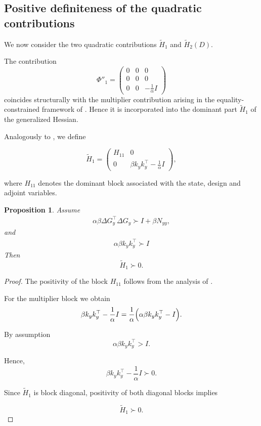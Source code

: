 \documentclass[11pt]{article}
\newtheorem{proposition}{Proposition}
\begin{document}
\subsection{Positive definiteness of the quadratic contributions}

We now consider the two quadratic contributions $\tilde{H}_1$ and $\tilde{H}_2(D)$.

The contribution
\[
\Phi''_1
=
\begin{pmatrix}
0&0&0\\
0&0&0\\
0&0&-\frac1\alpha I
\end{pmatrix}
\]
coincides structurally with the multiplier contribution arising in the
equality-constrained framework of \cite{walther2018equality}. Hence it
is incorporated into the dominant part $\tilde H_1$ of the generalized
Hessian.

Analogously to \cite{walther2018equality}, we define

\[
\tilde H_1=
\begin{pmatrix}
H_{11} & 0
\\
0 &
\beta k_y k_y^\top-\frac1\alpha I
\end{pmatrix},
\]

where $H_{11}$ denotes the dominant block associated with the state, design and adjoint variables.

\begin{proposition}
\label{prop:H1}
Assume
\begin{align}
    \alpha\beta \Delta G_y^\top \Delta G_y \succ I+\beta N_{yy},
\end{align}
and
\begin{align}
    \alpha\beta k_yk_y^\top \succ I
\end{align}
Then
\[
\tilde H_1\succ0.
\]
\end{proposition}

\begin{proof}

The positivity of the block $H_{11}$ follows from the analysis
of \cite{walther2018equality}.

For the multiplier block we obtain
\[
\beta k_yk_y^\top-\frac1\alpha I = \frac1\alpha \Bigl(
\alpha\beta k_yk_y^\top-I \Bigr).
\]

By assumption
\[
\alpha\beta k_yk_y^\top>I.
\]

Hence,
\[
\beta k_yk_y^\top-\frac1\alpha I
\succ0.
\]

Since $\tilde H_1$ is block diagonal, positivity of both diagonal blocks implies

\[
\tilde H_1\succ0.
\]

\end{proof}
\end{document}
